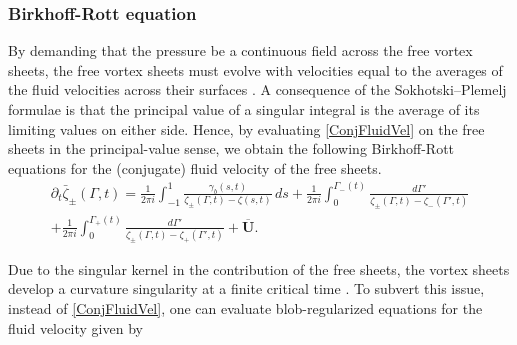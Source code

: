 \documentclass{article}[12pt]
\theoremstyle{Theorem}
\begin{document}
\subsubsection{Birkhoff-Rott equation}
By demanding that the pressure be a continuous field across the free vortex sheets, the free vortex sheets must evolve with velocities equal to the averages of the fluid velocities across their surfaces \cite[84]{eldredge_inviscid_flows}. A consequence of the Sokhotski–Plemelj formulae is that the principal value of a singular integral is the average of its limiting values on either side. Hence, by evaluating \eqref{ConjFluidVel} on the free sheets in the principal-value sense, we obtain the following Birkhoff-Rott equations for the (conjugate) fluid velocity of the free sheets.
\begin{multline}
     \partial_{t}\bar\zeta_{\pm}(\Gamma,t) = \frac{1}{2\pi i}\int_{-1}^{1}{\frac{\gamma_b(s,t)}{\zeta_{\pm}(\Gamma,t) - \zeta(s,t)}\, ds} + \frac{1}{2\pi i}\int_{0}^{\Gamma_-(t)}{\frac{d\Gamma'}{\zeta_{\pm}(\Gamma,t) - \zeta_{-}(\Gamma',t)}} \\ + 
     \frac{1}{2\pi i}\int_{0}^{\Gamma_+(t)}{\frac{d\Gamma'}{\zeta_{\pm}(\Gamma,t) - \zeta_{+}(\Gamma',t)}} + \overline{\boldsymbol{U}}. \label{Birkhoff-Rott}
\end{multline}

Due to the singular kernel in the contribution of the free sheets, the vortex sheets develop a curvature singularity at a finite critical time \cite{moore1979spontaneous, Krasny_1986, Shelley_1992}. To subvert this issue, instead of \eqref{ConjFluidVel}, one can evaluate blob-regularized equations for the fluid velocity given by 
\end{document}
